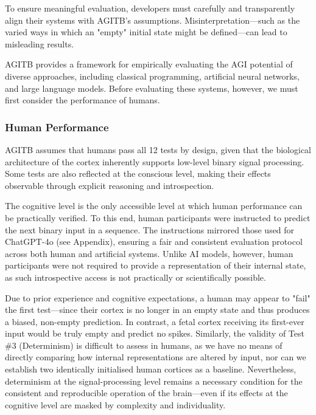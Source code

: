 \documentclass{article}
\begin{document}
To ensure meaningful evaluation, developers must carefully and transparently align their systems with AGITB's assumptions. Misinterpretation—such as the varied ways in which an "empty" initial state might be defined—can lead to
misleading results.

AGITB provides a framework for empirically evaluating the AGI potential of diverse approaches, including classical programming, artificial neural networks, and large language models. Before evaluating these systems, however, we must first consider the performance of humans.

\subsubsection{Human Performance}

AGITB assumes that humans pass all 12 tests by design, given that the biological architecture of the cortex inherently supports low-level binary signal processing. Some tests are also reflected at the conscious level, making their effects observable through explicit reasoning and introspection.

The cognitive level is the only accessible level at which human performance can be practically verified. To this end, human participants were instructed to predict the next binary input in a sequence. The instructions mirrored those used for ChatGPT-4o (see Appendix), ensuring a fair and consistent evaluation protocol across both human and artificial systems. Unlike AI models, however, human participants were not required to provide a representation of their internal state, as such introspective access is not practically or scientifically possible.

Due to prior experience and cognitive expectations, a human may appear to "fail" the first test—since their cortex is no longer in an empty state and thus produces a biased, non-empty prediction. In contrast, a fetal cortex receiving its first-ever input would be truly empty and predict no spikes. Similarly, the validity of Test \#3 (Determinism) is difficult to assess in humans, as we have no means of directly comparing how internal representations are altered by input, nor can we establish two identically initialised human cortices as a baseline. Nevertheless, determinism at the signal-processing level remains a necessary condition for the consistent and reproducible operation of the brain—even if its effects at the cognitive level are masked by complexity and individuality.
\end{document}
